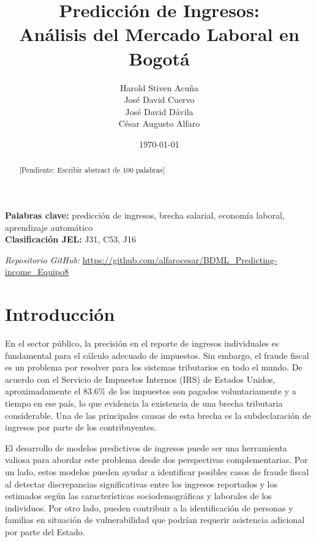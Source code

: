 \documentclass[12pt,a4paper,onecolumn]{article}
\title{Predicción de Ingresos: \\ Análisis del Mercado Laboral en Bogotá}
\author{%
\begin{center}
Harold Stiven Acuña \\
José David Cuervo \\
José David Dávila \\
César Augusto Alfaro
\end{center}%
}
\date{\today}
\begin{document}
\maketitle
\thispagestyle{empty}


\begin{abstract}
[Pendiente: Escribir abstract de 100 palabras]
\end{abstract}

\medskip

\begin{flushleft}
    {\bf Palabras clave:} predicción de ingresos, brecha salarial, economía laboral, aprendizaje automático \\
    {\bf Clasificación JEL:} J31, C53, J16
\end{flushleft}

\begin{center}
    \textit{Repositorio GitHub:} \url{https://github.com/alfarocesar/BDML_Predicting-income_Equipo8}
\end{center}

\pagebreak
\doublespacing


\section{Introducción}
En el sector público, la precisión en el reporte de ingresos individuales es fundamental para el cálculo adecuado de impuestos. Sin embargo, el fraude fiscal es un problema por resolver para los sistemas tributarios en todo el mundo. De acuerdo con el Servicio de Impuestos Internos (IRS) de Estados Unidos, aproximadamente el 83.6\% de los impuestos son pagados voluntariamente y a tiempo en ese país, lo que evidencia la existencia de una brecha tributaria considerable. Una de las principales causas de esta brecha es la subdeclaración de ingresos por parte de los contribuyentes.

El desarrollo de modelos predictivos de ingresos puede ser una herramienta valiosa para abordar este problema desde dos perspectivas complementarias. Por un lado, estos modelos pueden ayudar a identificar posibles casos de fraude fiscal al detectar discrepancias significativas entre los ingresos reportados y los estimados según las características sociodemográficas y laborales de los individuos. Por otro lado, pueden contribuir a la identificación de personas y familias en situación de vulnerabilidad que podrían requerir asistencia adicional por parte del Estado.
\end{document}
